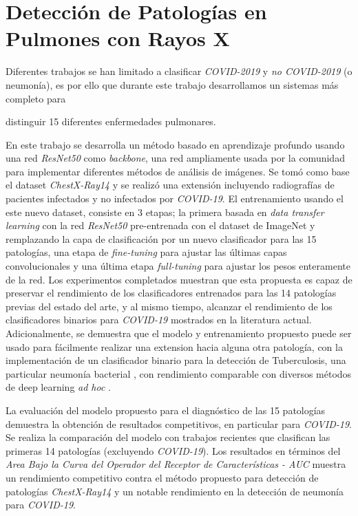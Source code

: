 \section{Detección de Patologías en Pulmones con Rayos X}

Diferentes trabajos se han limitado a clasificar \textit{COVID-2019} y \textit{no COVID-2019} (o
neumonía), es por ello que durante este trabajo desarrollamos un sistemas más completo para {
distinguir 15 diferentes enfermedades pulmonares.

En este trabajo se desarrolla un método basado en aprendizaje profundo usando una red \textit{ResNet50}
como \textit{backbone}, una red ampliamente usada por la comunidad para implementar diferentes métodos
de análisis de imágenes. Se tomó como base el dataset \textit{ChestX-Ray14} y se realizó una extensión
incluyendo radiografías de pacientes infectados y no infectados por \textit{COVID-19}. El entrenamiento
usando el este nuevo dataset, consiste en 3 etapas; la primera basada en \textit{data transfer learning}
con la red \textit{ResNet50} pre-entrenada con el dataset de ImageNet y remplazando la capa de clasificación
por un nuevo clasificador para las 15 patologías, una etapa de \textit{fine-tuning} para ajustar las
últimas capas convolucionales y una última etapa \textit{full-tuning} para ajustar los pesos enteramente
de la red. Los experimentos completados muestran que esta propuesta es capaz de preservar el rendimiento
de los clasificadores entrenados para las 14 patologías previas del estado del arte, y al mismo tiempo,
alcanzar el rendimiento de los clasificadores binarios para \textit{COVID-19} mostrados en la literatura
actual. Adicionalmente, se demuestra que el modelo y entrenamiento propuesto puede ser usado para
fácilmente realizar una extension hacia alguna otra patología, con la implementación de un clasificador
binario para la detección de Tuberculosis, una particular neumonía bacterial \cite{stirenko2018chest},
con rendimiento comparable con diversos métodos de deep learning \emph{ad hoc} \cite{puttagunta2021detection}.

La evaluación del modelo propuesto para el diagnóstico de las 15 patologías demuestra la obtención de
resultados competitivos, en particular para \textit{COVID-19}. Se realiza la comparación del modelo con
trabajos recientes que clasifican las primeras 14 patologías (excluyendo \textit{COVID-19}). Los
resultados en términos del \textit{Area Bajo la Curva del Operador del Receptor de Características  - AUC }
muestra un rendimiento competitivo contra el método propuesto para detección de patologías
\textit{ChestX-Ray14} y un notable rendimiento en la detección de neumonía para \textit{COVID-19}.

}
